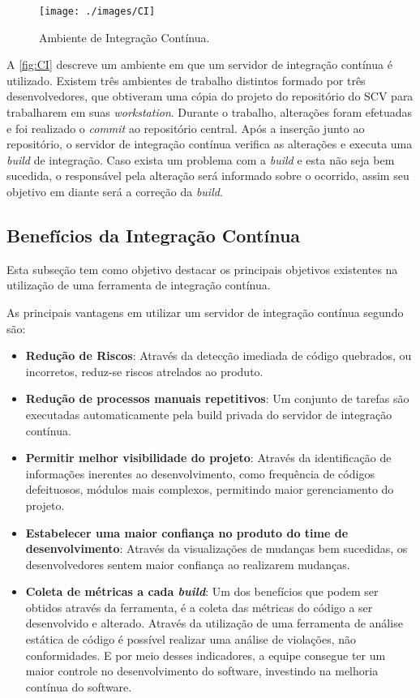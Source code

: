 \begin{figure}[H]
\centering
\caption[Ambiente de Integração Contínua]{Ambiente de Integração Contínua.}
\texttt{[image: ./images/CI]}
\label{fig:CI}
\end{figure}

A \autoref{fig:CI} descreve um ambiente em que um servidor de integração contínua é utilizado. Existem três ambientes de trabalho distintos formado por três desenvolvedores, que obtiveram uma cópia do projeto do repositório do SCV para trabalharem em suas \textit{workstation}. Durante o trabalho, alterações foram efetuadas e foi realizado o \textit{commit} ao repositório central. Após a inserção junto ao repositório, o servidor de integração contínua verifica as alterações e executa uma \textit{build} de integração. Caso exista um problema com a \textit{build} e esta não seja bem sucedida, o responsável pela alteração será informado sobre o ocorrido, assim seu objetivo em diante será a correção da \textit{build}.

\subsection{Benefícios da Integração Contínua}

Esta subseção tem como objetivo destacar os principais objetivos existentes na utilização de uma ferramenta de integração contínua.

As principais vantagens em utilizar um servidor de integração contínua segundo  são:

\begin{itemize}
\item {\textbf{Redução de Riscos}}: 
Através da detecção imediada de código quebrados, ou incorretos, reduz-se riscos atrelados ao produto.
\item {\textbf{Redução de processos manuais repetitivos}}:
Um conjunto de tarefas são executadas automaticamente pela build privada do servidor de integração contínua.
\item {\textbf{Permitir melhor visibilidade do projeto}}:
Através da identificação de informações inerentes ao desenvolvimento, como frequência de códigos defeituosos, módulos mais complexos, permitindo maior gerenciamento do projeto.
\item {\textbf{Estabelecer uma maior confiança no produto do time de desenvolvimento}}:
Através da visualizações de mudanças bem sucedidas, os desenvolvedores sentem maior confiança ao realizarem mudanças.

\item\textbf{Coleta de métricas a cada \textit{build}}: Um dos benefícios que podem ser obtidos através da ferramenta, é a coleta das métricas do código a ser desenvolvido e alterado. Através da utilização de uma ferramenta de análise estática de código é possível realizar uma análise de violações, não conformidades. E por meio desses indicadores, a equipe consegue ter um maior controle no desenvolvimento do software, investindo na melhoria contínua do software.
\end{itemize}	

